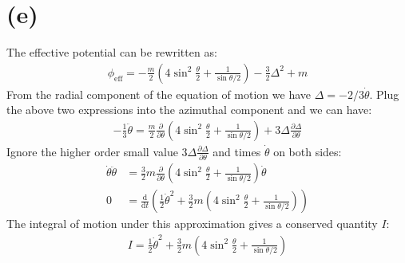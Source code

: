 \documentclass[a4paper,12pt]{article}
\renewcommand{\d}{\mathrm{d}}
\begin{document}
\section*{(e)}
The effective potential can be rewritten as:
\begin{align*}
    \phi_{\text{eff}} =-\frac{m}{2}(4\sin ^2 \frac{\theta}{2} +\frac{1}{\sin \theta/2}) - \frac{3}{2} \Delta^2 + m
\end{align*}
From the radial component of the equation of motion we have $\Delta = -2/3 \dot{\theta}$.
Plug the above two expressions into the azimuthal component and we can have:
\begin{align*}
    - \frac{1}{3} \ddot{\theta} = \frac{m}{2} \frac{\partial}{\partial \theta} (4\sin ^2 \frac{\theta}{2} +\frac{1}{\sin \theta/2}) + 3 \Delta \frac{\partial \Delta}{\partial \theta}
\end{align*}
Ignore the higher order small value $3 \Delta \frac{\partial \Delta}{\partial \theta}$ and times $\dot{\theta}$ on both sides:
\begin{align*}
    \dot{\theta} \ddot{\theta} &= \frac{3}{2} m \frac{\partial}{\partial \theta} (4\sin ^2 \frac{\theta}{2} +\frac{1}{\sin \theta/2}) \dot{\theta} \\
    0 &= \frac{\d}{\d t}(\frac{1}{2} \dot{\theta}^2 + \frac{3}{2}m (4\sin ^2 \frac{\theta}{2} +\frac{1}{\sin \theta/2}))
\end{align*}
The integral of motion under this approximation gives a conserved quantity $I$:
\begin{align*}
    I = \frac{1}{2} \dot{\theta}^2 + \frac{3}{2}m (4\sin ^2 \frac{\theta}{2} +\frac{1}{\sin \theta/2})
\end{align*}
\end{document}
